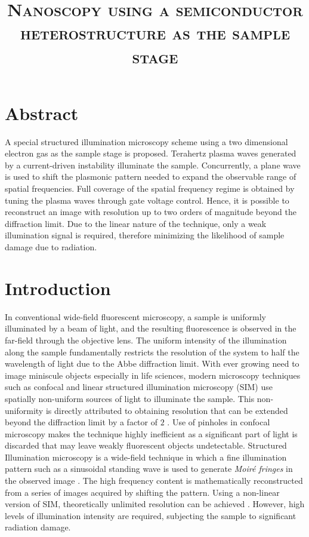 \documentclass[11pt]{article}
\begin{document}
\title{\textsc{Nanoscopy using a semiconductor heterostructure as the sample stage}}

\maketitle


\section{Abstract}
%
A special structured illumination microscopy scheme using a two dimensional electron gas as the sample stage is proposed. Terahertz plasma waves generated by a current-driven instability illuminate the sample. Concurrently, a plane wave is used to shift the plasmonic pattern needed to expand the observable range of spatial frequencies. Full coverage of the spatial frequency regime is obtained by tuning the plasma waves through gate voltage control. Hence, it is possible to reconstruct an image with resolution up to two orders of magnitude beyond the diffraction limit. Due to the linear nature of the technique, only a weak illumination signal is required, therefore minimizing the likelihood of sample damage due to radiation.
%
\section{Introduction}
%
In conventional wide-field fluorescent microscopy, a sample is uniformly illuminated by a beam of light, and the resulting fluorescence is observed in the far-field through the objective lens. The uniform intensity of the illumination along the sample fundamentally restricts the resolution of the system to half the wavelength of light due to the Abbe diffraction limit. With ever growing need to image miniscule objects especially in life sciences, modern microscopy techniques such as confocal and linear structured illumination microscopy (SIM) use spatially non-uniform sources of light to illuminate the sample. This non-uniformity is directly attributed to obtaining resolution that can be extended beyond the diffraction limit by a factor of $2$ \cite{Minsky1988,Gustafsson2000}. Use of pinholes in confocal microscopy makes the technique highly inefficient as a significant part of light is discarded that may leave weakly fluorescent objects undetectable. Structured Illumination microscopy is a wide-field technique in which a fine illumination pattern such as a sinusoidal standing wave is used to generate \emph{Moiré fringes} in the
observed image \cite{Heintzmann1999, Heintzmann2006}. The high frequency content is mathematically reconstructed from a series of images acquired by shifting the pattern. Using a non-linear version of SIM, theoretically unlimited resolution can be achieved \cite{Gustafsson_2005}. However, high levels of illumination intensity are required, subjecting the sample to significant radiation damage.
\end{document}
